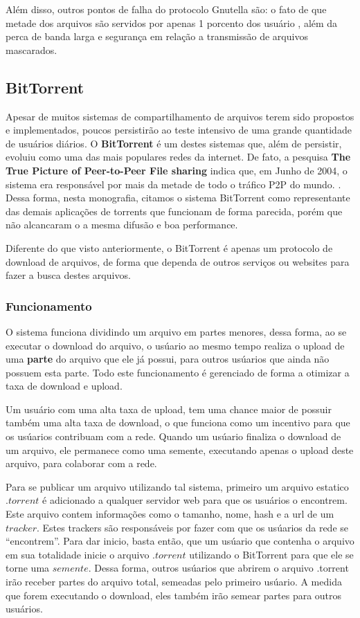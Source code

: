 \documentclass[a4paper]{article}
\begin{document}
Além disso, outros pontos de falha do protocolo Gnutella são: o fato de que metade dos arquivos são servidos por apenas 1 porcento dos usuário , além da perca de banda larga e segurança em relação a transmissão de arquivos mascarados.\cite{gayatriGN}

\subsection{BitTorrent}
Apesar de muitos sistemas de compartilhamento de arquivos terem sido propostos e implementados, poucos persistirão ao teste intensivo de uma grande quantidade de usuários diários. O \textbf{BitTorrent} é um destes sistemas que, além de persistir, evoluiu como uma das mais populares redes da internet. De fato, a pesquisa \textbf{The True Picture of Peer-to-Peer File sharing} indica que, em Junho de 2004, o sistema era responsável por mais da metade de todo o tráfico P2P do mundo. \cite{pouwelsebit}. Dessa forma, nesta monografia, citamos o sistema BitTorrent como representante das demais aplicações de torrents que funcionam de forma parecida, porém que não alcancaram o a mesma difusão e boa performance.

Diferente do que visto anteriormente, o BitTorrent é apenas um protocolo de download de arquivos, de forma que dependa de outros serviços ou websites para fazer a busca destes arquivos\cite{pouwelsebit, CohenBIT}.

\subsubsection{Funcionamento}

O sistema funciona dividindo um arquivo em partes menores, dessa forma, ao se executar o download do arquivo, o usúario ao mesmo tempo realiza o upload de uma \textbf{parte} do arquivo que ele já possui, para outros usúarios que ainda não possuem esta parte. Todo este funcionamento é gerenciado de forma a otimizar a taxa de download e upload. 

Um usuário com uma alta taxa de upload, tem uma chance maior de possuir também uma alta taxa de download, o que funciona como um incentivo para que os usúarios contribuam com a rede. Quando um usúario finaliza o download de um arquivo, ele permanece como uma semente, executando apenas o upload deste arquivo, para colaborar com a rede. \cite{CohenBIT}

Para se publicar um arquivo utilizando tal sistema, primeiro um arquivo estatico $.torrent$ é adicionado a qualquer servidor web para que os usuários o encontrem. Este arquivo contem informações como o tamanho, nome, hash e a url de um $tracker$.  Estes trackers são responsáveis por fazer com que os usúarios da rede se ``encontrem''.  Para dar inicio, basta então, que um usúario que contenha o arquivo em sua totalidade inicie o arquivo $.torrent$ utilizando o BitTorrent para que ele se torne uma $semente$. Dessa forma, outros usúarios que abrirem o arquivo .torrent irão receber partes do arquivo total, semeadas pelo primeiro usúario. A medida que forem executando o download, eles também irão semear partes para outros usuários.\cite{CohenBIT}
\end{document}
